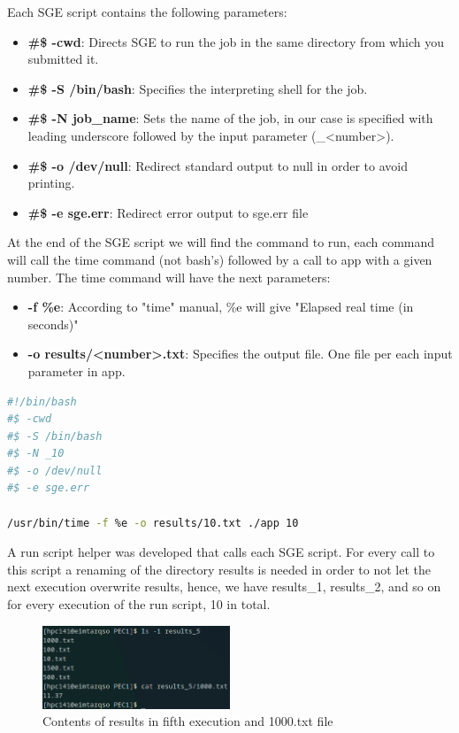 \documentclass[11pt]{article}
\begin{document}
Each SGE script contains the following parameters:

\begin{itemize}
    \item \textbf{\#\$ -cwd}: Directs SGE to run the job in the same directory from which you submitted it.
    \item \textbf{\#\$ -S /bin/bash}: Specifies the interpreting shell for the job. 
    \item \textbf{\#\$ -N job\_name}: Sets the name of the job, in our case is specified with leading underscore followed by the input parameter (\_<number>).
    \item \textbf{\#\$ -o /dev/null}: Redirect standard output to null in order to avoid printing.
    \item \textbf{\#\$ -e sge.err}: Redirect error output to sge.err file
\end{itemize}

At the end of the SGE script we will find the command to run, each command will call the time command (not bash's) followed by a call to app with a given number. The time command will have the next parameters:

\begin{itemize}
    \item \textbf{-f \%e}: According to "time" manual, \%e will give "Elapsed real time (in seconds)"
    \item \textbf{-o results/<number>.txt}: Specifies the output file. One file per each input parameter in app.
\end{itemize}

\begin{lstlisting}[language=bash, caption=Contents of 10.sge script]
#!/bin/bash
#$ -cwd
#$ -S /bin/bash
#$ -N _10
#$ -o /dev/null
#$ -e sge.err

/usr/bin/time -f %e -o results/10.txt ./app 10

\end{lstlisting}

A run script helper was developed that calls each SGE script. For every call to this script a renaming of the directory results is needed in order to not let the next execution overwrite results, hence, we have results\_1, results\_2, and so on for every execution of the run script, 10 in total.

\begin{figure}[h]
\caption{Contents of results in fifth execution and 1000.txt file}
\centering
\includegraphics[width=0.5\textwidth]{results.png}
\end{figure}
\end{document}
